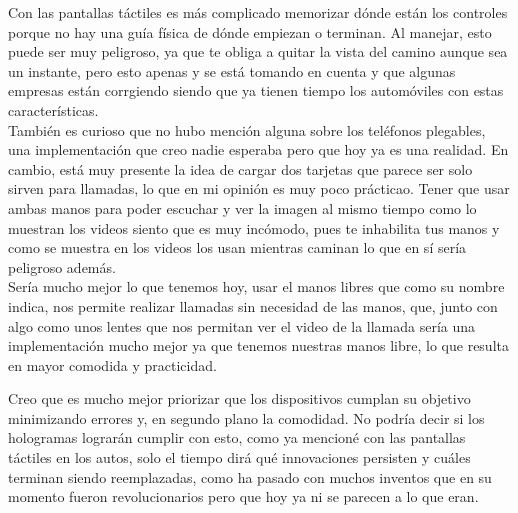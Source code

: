 \documentclass[12pt,letterpaper]{article}
\begin{document}
\noindent
Con las pantallas táctiles es más complicado memorizar dónde están los controles porque no hay una guía física de
dónde empiezan o terminan. Al manejar, esto puede ser muy peligroso, ya que te obliga a quitar la vista del
camino aunque sea un instante, pero esto apenas y se está tomando en cuenta y que algunas empresas están
corrgiendo siendo que ya tienen tiempo los automóviles con estas características.\\

También es curioso que no hubo mención alguna sobre los teléfonos plegables, una implementación que creo nadie
esperaba pero que hoy ya es una realidad. En cambio, está muy presente la idea de cargar dos tarjetas que parece
ser solo sirven para llamadas, lo que en mi opinión es muy poco prácticao. Tener que usar ambas manos para poder
escuchar y ver la imagen al mismo tiempo como lo muestran los videos siento que es muy incómodo, pues te
inhabilita tus manos y como se muestra en los videos los usan mientras caminan lo que en sí sería peligroso
además.\\

\noindent
Sería mucho mejor lo que tenemos hoy, usar el manos libres que como su nombre indica, nos permite realizar
llamadas sin necesidad de las manos, que, junto con algo como unos lentes que nos permitan ver el video de la
llamada sería una implementación mucho mejor ya que tenemos nuestras manos libre, lo que resulta en mayor
comodida y practicidad.

\noindent
Creo que es mucho mejor priorizar que los dispositivos cumplan su objetivo minimizando errores y, en segundo
plano la comodidad. No podría decir si los hologramas lograrán cumplir con esto, como ya mencioné con las
pantallas táctiles en los autos, solo el tiempo dirá qué innovaciones persisten y cuáles terminan siendo
reemplazadas, como ha pasado con muchos inventos que en su momento fueron revolucionarios pero que hoy ya ni se
parecen a lo que eran.
\end{document}
